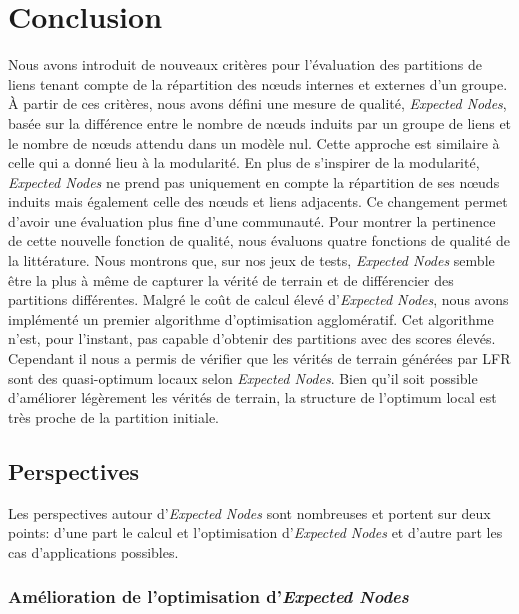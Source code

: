 \section{Conclusion}

Nous avons introduit de nouveaux critères pour l'évaluation des partitions de liens tenant compte de la répartition des n\oe{}uds internes et externes d'un groupe.
\`A partir de ces critères, nous avons défini une mesure de qualité, \emph{Expected Nodes}, basée sur la différence entre le nombre de n\oe{}uds induits par un groupe de liens et le nombre de n\oe{}uds attendu dans un modèle nul.
Cette approche est similaire à celle qui a donné lieu à la modularité.
En plus de s'inspirer de la modularité, \emph{Expected Nodes} ne prend pas uniquement en compte la répartition de ses n\oe{}uds induits mais également celle des n\oe{}uds et liens adjacents.
Ce changement permet d'avoir une évaluation plus fine d'une communauté.
Pour montrer la pertinence de cette nouvelle fonction de qualité, nous évaluons quatre fonctions de qualité de la littérature.
Nous montrons que, sur nos jeux de tests, \emph{Expected Nodes} semble être la plus à même de capturer la vérité de terrain et de différencier des partitions différentes.
Malgré le coût de calcul élevé d'\emph{Expected Nodes}, nous avons implémenté un premier algorithme d'optimisation agglomératif.
Cet algorithme n'est, pour l'instant, pas capable d'obtenir des partitions avec des scores élevés.
Cependant il nous a permis de vérifier que les vérités de terrain générées par LFR sont des quasi-optimum locaux selon \emph{Expected Nodes}.
Bien qu'il soit possible d'améliorer légèrement les vérités de terrain, la structure de l'optimum local est très proche de la partition initiale.


\subsection{Perspectives}

Les perspectives autour d'\emph{Expected Nodes} sont nombreuses et portent sur deux points: d'une part le calcul et l'optimisation d'\emph{Expected Nodes} et d'autre part les cas d'applications possibles.

\subsubsection{Amélioration de l'optimisation d'\emph{Expected Nodes}}

